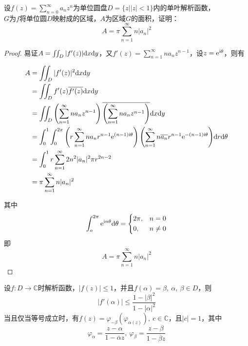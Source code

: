 \begin{proposition}
    
    设$f(z) = \sum\limits_{n=0}^{\infty}{a_nz^n}$为单位圆盘$D = \{z\big| |z| < 1\}$内的单叶解析函数，\\
    $G$为$f$将单位圆$D$映射成的区域，$A$为区域$G$的面积，证明：
    $$A =  \pi\sum_{n=1}^{\infty}{n|a_n|^2}$$

\end{proposition}

\begin{proof}
    
    易证$A = \iint_{D}{|f'(z)|}\mathrm{d} x\mathrm{d} y$，又$f'(z) = \sum\limits_{n=1}^{\infty}{na_nz^{n-1}}$，设$z = \mathrm{e}^{\mathrm{i}\theta}$，则有

    \begin{align*}
        A & = \iint_{D}{|f'(z)|^2}\mathrm{d} x\mathrm{d} y \\ 
          & = \iint_{D}{f'(z)\overline{{f'(z)}}}\mathrm{d} x\mathrm{d} y \\
          & = \iint_{D}{\left(\sum_{n=1}^{\infty}{na_nz^{n-1}}\right)\overline{\left(\sum_{n=1}^{\infty}{na_nz^{n-1}}\right)}}\mathrm{d} x\mathrm{d} y \\
          & = \int_{0}^{1}{\int_{0}^{2 \pi}{\left(r\sum_{n=1}^{\infty}{na_nr^{n-1}\mathrm{e}^{(n-1)\mathrm{i}\theta}}\right)\left(\sum_{n=1}^{\infty}{n\overline{a_n}r^{n-1}\mathrm{e}^{-(n-1)\mathrm{i}\theta}}\right)}\mathrm{d} r}\mathrm{d} \theta \\
          & = \int_{0}^{1}{r\sum_{n=1}^{\infty}{2n^2|a_n|^2 \pi r^{2n-2}}} \\
          & = \pi \sum_{n=1}^{\infty}{n|a_n|^2}
    \end{align*}

    其中
    $$
    \int_{o}^{2\pi}{\mathrm{e}^{\mathrm{i} n\theta}}\mathrm{d} \theta = 
    \left\{
        \begin{aligned}
            &2\pi, & n=0\\
            &0, & n \neq 0\\
        \end{aligned}
    \right.
    $$
    即
    $$A = \pi \sum_{n=1}^{\infty}{n|a_n|^2}$$

\end{proof}

\begin{proposition}

    设$f:D\to\mathbb{C}$时解析函数，$|f(z)| \leq 1$，并且$f(\alpha) = \beta,\ \alpha,\ \beta \in D$，则
    $$|f'(\alpha)| \leq \dfrac{1-|\beta|^2}{1-|\alpha|^2}$$
    当且仅当等号成立时，有$f(z) = \varphi_{-\beta}(\varphi_{\alpha(z)}),\ c \in \mathbb{C}$，且$|c| = 1$，其中
    $$\varphi_{\alpha} = \dfrac{z -\alpha}{1 - \overline{\alpha}{z}},\ \varphi_{\beta} = \dfrac{z -\beta}{1 - \overline{\beta}{z}}$$

\end{proposition}

